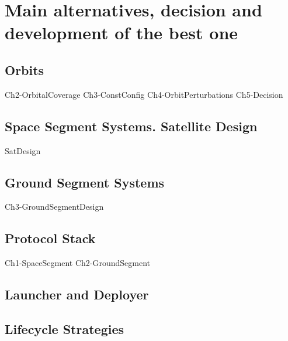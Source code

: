 \chapter{Main alternatives, decision and development of the best one}

\section{Orbits}
{Ch2-OrbitalCoverage}
{Ch3-ConstConfig}
{Ch4-OrbitPerturbations}
{Ch5-Decision}

\section{Space Segment Systems. Satellite Design}
{SatDesign}

\section{Ground Segment Systems}
{Ch3-GroundSegmentDesign}

\section{Protocol Stack}
{Ch1-SpaceSegment}
{Ch2-GroundSegment}

\section{Launcher and Deployer}

\section{Lifecycle Strategies}
